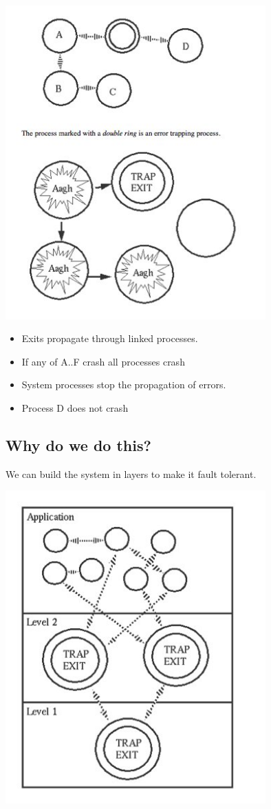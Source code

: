 \documentclass[12pt]{article}
\begin{document}
\includegraphics[width=10cm]{images/crashing.jpg}

\begin{itemize}
\item Exits propagate through linked processes. 
\item If any of A..F crash all processes crash
\item System processes stop the propagation of errors. 
\item Process D  does not crash
\end{itemize}

\subsection{Why do we do this?}

We can build the system in layers to make it fault tolerant.

\includegraphics[width=10cm]{images/layers.jpg}
\end{document}
